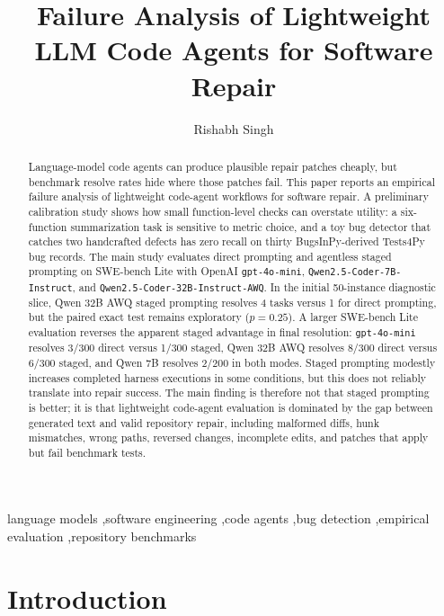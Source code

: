 \documentclass[preprint,12pt]{elsarticle}
\begin{document}
\begin{frontmatter}

\title{Failure Analysis of Lightweight LLM Code Agents for Software Repair}

\author[addr1]{Rishabh Singh}
\address[addr1]{Independent Researcher, Seattle, Washington, United States}

\begin{abstract}
Language-model code agents can produce plausible repair patches cheaply, but benchmark resolve rates hide where those patches fail. This paper reports an empirical failure analysis of lightweight code-agent workflows for software repair. A preliminary calibration study shows how small function-level checks can overstate utility: a six-function summarization task is sensitive to metric choice, and a toy bug detector that catches two handcrafted defects has zero recall on thirty BugsInPy-derived Tests4Py bug records. The main study evaluates direct prompting and agentless staged prompting on SWE-bench Lite with OpenAI \texttt{gpt-4o-mini}, \texttt{Qwen2.5-Coder-7B-Instruct}, and \texttt{Qwen2.5-Coder-32B-Instruct-AWQ}. In the initial 50-instance diagnostic slice, Qwen 32B AWQ staged prompting resolves 4 tasks versus 1 for direct prompting, but the paired exact test remains exploratory ($p=0.25$). A larger SWE-bench Lite evaluation reverses the apparent staged advantage in final resolution: \texttt{gpt-4o-mini} resolves 3/300 direct versus 1/300 staged, Qwen 32B AWQ resolves 8/300 direct versus 6/300 staged, and Qwen 7B resolves 2/200 in both modes. Staged prompting modestly increases completed harness executions in some conditions, but this does not reliably translate into repair success. The main finding is therefore not that staged prompting is better; it is that lightweight code-agent evaluation is dominated by the gap between generated text and valid repository repair, including malformed diffs, hunk mismatches, wrong paths, reversed changes, incomplete edits, and patches that apply but fail benchmark tests.
\end{abstract}

\begin{keyword}
language models \sep software engineering \sep code agents \sep bug detection \sep empirical evaluation \sep repository benchmarks
\end{keyword}

\end{frontmatter}
\section{Introduction}
\end{document}
